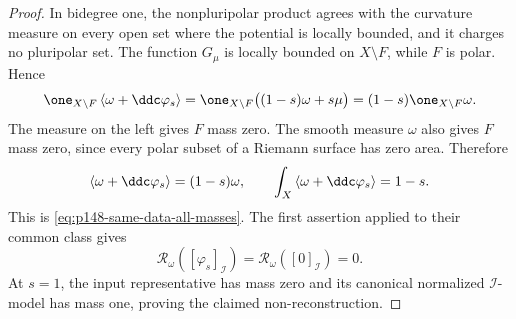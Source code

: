 \begin{proof}
In bidegree one, the nonpluripolar product agrees with the curvature measure
on every open set where the potential is locally bounded, and it charges no
pluripolar set.  The function \(G_\mu\) is locally bounded on
\(X\setminus F\), while \(F\) is polar.  Hence
\[
 \one_{X\setminus F}
 \left\langle\omega+\ddc\varphi_s\right\rangle
 =\one_{X\setminus F}\bigl((1-s)\omega+s\mu\bigr)
 =(1-s)\one_{X\setminus F}\omega.
\]
The measure on the left gives \(F\) mass zero.  The smooth measure
\(\omega\) also gives \(F\) mass zero, since every polar subset of a Riemann
surface has zero area.  Therefore
\[
 \left\langle\omega+\ddc\varphi_s\right\rangle=(1-s)\omega,
 \qquad
 \int_X\left\langle\omega+\ddc\varphi_s\right\rangle=1-s.
\]
This is \eqref{eq:p148-same-data-all-masses}.  The first assertion applied
to their common class gives
\[
 \mathcal R_\omega([\varphi_s]_{\mathcal I})
 =\mathcal R_\omega([0]_{\mathcal I})=0.
\]
At \(s=1\), the input representative has mass zero and its canonical
normalized \(\mathcal I\)-model has mass one, proving the claimed
non-reconstruction.
\end{proof}
